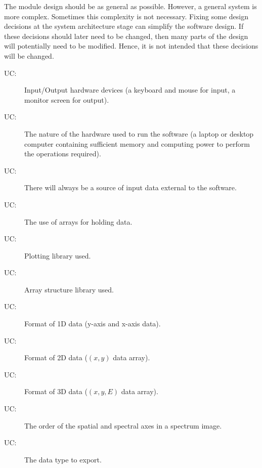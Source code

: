\documentclass[12pt, titlepage]{article}
\newcounter{ucnum}
\newcommand{\uctheucnum}{UC\theucnum}
\begin{document}
The module design should be as general as possible. However, a general system is
more complex. Sometimes this complexity is not necessary. Fixing some design
decisions at the system architecture stage can simplify the software design. If
these decisions should later need to be changed, then many parts of the design
will potentially need to be modified. Hence, it is not intended that these
decisions will be changed.

\begin{description}
	\item[ \uctheucnum \label{ucIO}:] Input/Output hardware
devices (a keyboard and mouse for input, a monitor screen for output).
	\item[ \uctheucnum \label{ucHardware}:] The nature of the
hardware used to run the software (a laptop or desktop computer containing
sufficient memory and computing power to perform the operations required).
	\item[ \uctheucnum \label{ucInput}:] There will always be
	  a source of input data external to the software.
	\item[ \uctheucnum \label{ucArray}:]  The use of arrays
for holding data. 
	\item[ \uctheucnum \label{ucPlottingLibrary}:]  Plotting
library used.
	\item[ \uctheucnum \label{ucArrayLibrary}:]  Array
structure library used. 
	\item[ \uctheucnum \label{uc1DdataFormat}:]  Format of 1D
data (y-axis and x-axis data). 
	\item[ \uctheucnum \label{uc2DdataFormat}:]  Format of 2D
data ($(x,y)$ data array).
	\item[ \uctheucnum \label{uc3DdataFormat}:]  Format of 3D
data ($(x,y,E)$ data array).
	\item[ \uctheucnum \label{uc3DSIAxisOrder}:] The order of
the spatial and spectral axes in a spectrum image.
	\item[ \uctheucnum \label{ucExDataType}:] The data type
to export.
\end{description}
\end{document}
